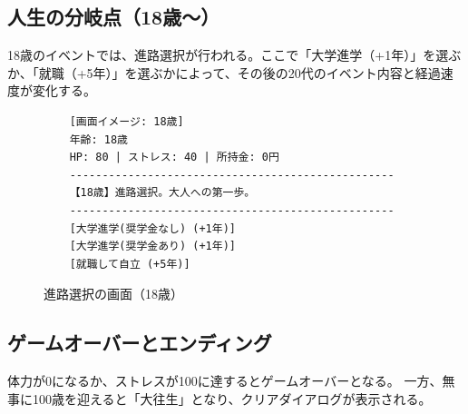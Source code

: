 \documentclass[a4paper,11pt]{jsarticle}
\begin{document}
\subsection{人生の分岐点（18歳〜）}
18歳のイベントでは、進路選択が行われる。ここで「大学進学（+1年）」を選ぶか、「就職（+5年）」を選ぶかによって、その後の20代のイベント内容と経過速度が変化する。

\begin{figure}[H]
    \centering
    \begin{verbatim}
    [画面イメージ: 18歳]
    年齢: 18歳
    HP: 80 | ストレス: 40 | 所持金: 0円
    --------------------------------------------------
    【18歳】進路選択。大人への第一歩。
    --------------------------------------------------
    [大学進学(奨学金なし) (+1年)]
    [大学進学(奨学金あり) (+1年)]
    [就職して自立 (+5年)]
    \end{verbatim}
    \caption{進路選択の画面（18歳）}
\end{figure}

\subsection{ゲームオーバーとエンディング}
体力が0になるか、ストレスが100に達するとゲームオーバーとなる。
一方、無事に100歳を迎えると「大往生」となり、クリアダイアログが表示される。
\end{document}
